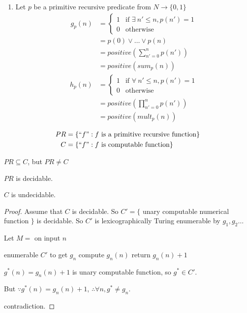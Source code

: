 \begin{enumerate}
    \item Let $p$ be a primitive recursive predicate from $N\to\{ 0,1\}$
    \begin{align*}
        g_p(n)&=\left\{ \begin{array}{ll}
            1 & \text{if }\exists\ n' \le n, p(n')=1\\
            0 & \text{otherwise}
        \end{array} \right.\\
        &=p(0)\lor \dots \lor p(n)\\
        &=positive(\sum_{n'=0}^n p(n'))\\
        &=positive(sum_p(n))
    \end{align*}
    \begin{align*}
        h_p(n)&=\left\{ \begin{array}{ll}
            1 & \text{if }\forall\ n' \le n, p(n')=1\\
            0 & \text{otherwise}
        \end{array} \right.\\
        &=positive(\prod_{n'=0}^np(n'))\\
        &=positive(mult_p(n))
    \end{align*}
\end{enumerate}

\begin{definition}\quad 
    \begin{align*}
        PR&=\{ {``f"}:f\text{ is a primitive recursive function} \}\\
        C&=\{  {``f"}: f\text{ is computable function} \}
    \end{align*}
\end{definition}
$PR \subseteq C$, but $PR \ne C$

\begin{lemma}
    $PR$ is decidable. 
\end{lemma}

\begin{lemma}
    $C$ is undecidable. 
\end{lemma}
\begin{proof}
    Assume that $C$ is decidable. So $C'=\{$ unary computable numerical function $\}$ is decidable. So $C'$ is lexicographically Turing enumerable by $g_1,g_2\dots$

    Let $M=$ on input $n$
    \begin{algorithm}[H]
        \caption{$M$}
        \begin{algorithmic}
            \State enumerable $C'$ to get $g_n$
            \State compute $g_n(n)$
            \State return $g_n(n)+1$
        \end{algorithmic}
    \end{algorithm}
    
    $g^*(n)=g_n(n)+1$ is unary computable function, so $g^*\in C'$. 
    
    But $\because g^*(n)=g_n(n)+1$, $\therefore \forall n, g^* \ne g_n$. 
    
    contradiction. 
\end{proof}

